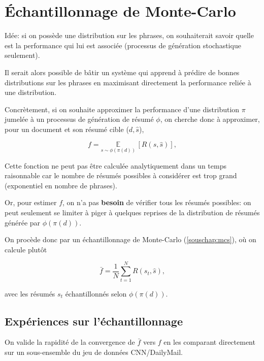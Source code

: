 \chapter{Échantillonnage de Monte-Carlo}
\label{chap:mcs}                   %

Idée: si on possède une distribution sur les phrases, on souhaiterait savoir
quelle est la performance qui lui est associée (processus de génération
stochastique seulement).

Il serait alors possible de bâtir un système qui apprend à prédire de bonnes
distributions sur les phrases en maximisant directement la performance
reliée à une distribution.

Concrètement, si on souhaite approximer la performance d'une distribution $\pi$
jumelée à un processus de génération de résumé $\phi$, on cherche donc à approximer,
pour un document et son résumé cible ($d, \hat{s}$),

\begin{equation}
    f = \underset{{s \sim \phi(\pi(d))}}{\mathbb{E}} \,\left[R(s, \hat{s})\right],
\end{equation}



Cette fonction ne peut pas être calculée analytiquement dans un temps
raisonnable car le nombre de résumés possibles à considérer est trop grand
(exponentiel en nombre de phrases).

Or, pour estimer $f$, on n'a pas \textbf{besoin} de vérifier tous les résumés
possibles: on peut seulement se limiter à piger à quelques reprises de la distribution
de résumés générée par $\phi(\pi(d))$.

On procède donc par un échantillonnage de Monte-Carlo (\ref{souschap:mcs}), où on
calcule plutôt

\begin{equation}
    \bar{f} = \frac{1}{N} \sum_{t=1}^N R(s_t, \hat{s}),
\end{equation}

avec les résumés $s_t$ échantillonnés selon $\phi(\pi(d))$.

\section{Expériences sur l'échantillonnage}

On valide la rapidité de la convergence de $\bar{f}$ vers $f$ en les comparant
directement sur un sous-ensemble du jeu de données CNN/DailyMail.

